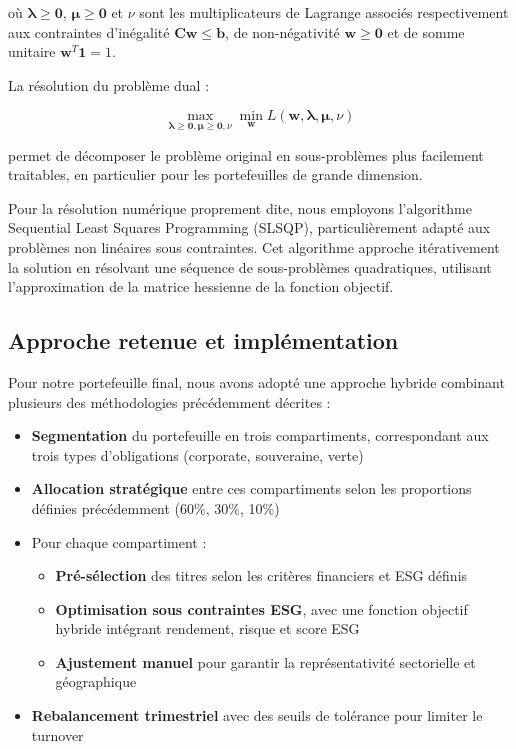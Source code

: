 où $\boldsymbol{\lambda} \geq \mathbf{0}$, $\boldsymbol{\mu} \geq \mathbf{0}$ et $\nu$ sont les multiplicateurs de Lagrange associés respectivement aux contraintes d'inégalité $\mathbf{C}\mathbf{w} \leq \mathbf{b}$, de non-négativité $\mathbf{w} \geq \mathbf{0}$ et de somme unitaire $\mathbf{w}^T\mathbf{1} = 1$.

La résolution du problème dual :

\begin{equation}
\max_{\boldsymbol{\lambda} \geq \mathbf{0}, \boldsymbol{\mu} \geq \mathbf{0}, \nu} \min_{\mathbf{w}} L(\mathbf{w}, \boldsymbol{\lambda}, \boldsymbol{\mu}, \nu)
\end{equation}

permet de décomposer le problème original en sous-problèmes plus facilement traitables, en particulier pour les portefeuilles de grande dimension.

Pour la résolution numérique proprement dite, nous employons l'algorithme Sequential Least Squares Programming (SLSQP), particulièrement adapté aux problèmes non linéaires sous contraintes. Cet algorithme approche itérativement la solution en résolvant une séquence de sous-problèmes quadratiques, utilisant l'approximation de la matrice hessienne de la fonction objectif.

\subsection{Approche retenue et implémentation}

Pour notre portefeuille final, nous avons adopté une approche hybride combinant plusieurs des méthodologies précédemment décrites :

\begin{itemize}
    \item \textbf{Segmentation} du portefeuille en trois compartiments, correspondant aux trois types d'obligations (corporate, souveraine, verte)
    
    \item \textbf{Allocation stratégique} entre ces compartiments selon les proportions définies précédemment (60\%, 30\%, 10\%)
    
    \item Pour chaque compartiment :
    \begin{itemize}
        \item \textbf{Pré-sélection} des titres selon les critères financiers et ESG définis
        \item \textbf{Optimisation sous contraintes ESG}, avec une fonction objectif hybride intégrant rendement, risque et score ESG
        \item \textbf{Ajustement manuel} pour garantir la représentativité sectorielle et géographique
    \end{itemize}
    
    \item \textbf{Rebalancement trimestriel} avec des seuils de tolérance pour limiter le turnover
\end{itemize}

